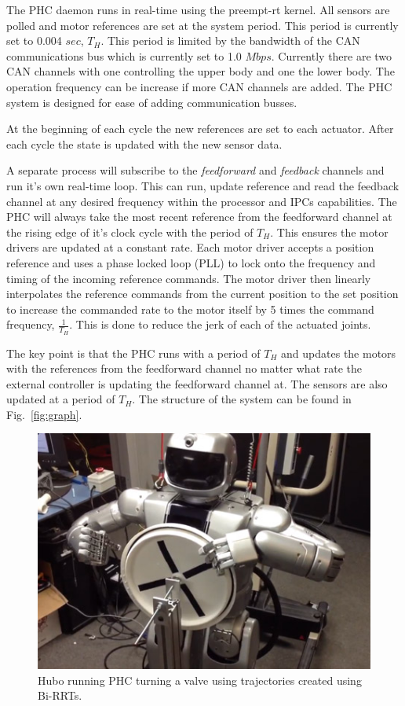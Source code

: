 The PHC daemon runs in real-time using the preempt-rt kernel.  
All sensors are polled and motor references are set at the system period.  
This period is currently set to 0.004 $sec$, $T_H$.  
This period is limited by the bandwidth of the CAN communications bus which is currently set to 1.0 $Mbps$.  
Currently there are two CAN channels with one controlling the upper body and one the lower body.  
The operation frequency can be increase if more CAN channels are added.  
The PHC system is designed for ease of adding communication busses.  

At the beginning of each cycle the new references are set to each actuator.  
After each cycle the state is updated with the new sensor data.

A separate process will subscribe to the \textit{feedforward} and \textit{feedback} channels and run it's own real-time loop.  
This can run, update reference and read the feedback channel at any desired frequency within the processor and IPCs capabilities.
The PHC will always take the most recent reference from the feedforward channel at the rising edge of it's clock cycle with the period of $T_H$.
This ensures the motor drivers are updated at a constant rate. 
Each motor driver accepts a position reference and uses a phase locked loop (PLL) to lock onto the frequency and timing of the incoming reference commands.
The motor driver then linearly interpolates the reference commands from the current position to the set position to increase the commanded rate to the motor itself by 5 times the command frequency, $\frac{1}{T_H}$.
This is done to reduce the jerk of each of the actuated joints.

The key point is that the PHC runs with a period of $T_H$ and updates the motors with the references from the feedforward channel no matter what rate the external controller is updating the feedforward channel at.  
The sensors are also updated at a period of $T_H$.
The structure of the system can be found in Fig.~\ref{fig:graph}.

\begin{figure}[thpb]
  \centering
\includegraphics[width=1.0\columnwidth]{./pix/hubo_valve.png}
  \caption{Hubo running PHC turning a valve using trajectories created using Bi-RRTs. }
  \label{fig:valve}
\end{figure}

